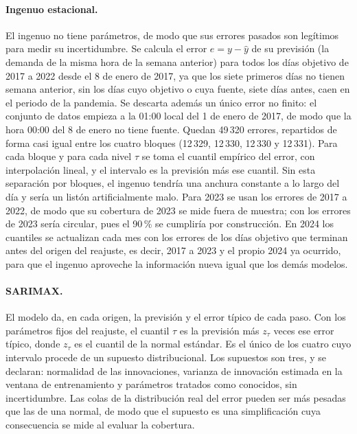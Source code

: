 \paragraph{Ingenuo estacional.} El ingenuo no tiene parámetros, de modo que sus
errores pasados son legítimos para medir su incertidumbre. Se calcula el error
$e = y - \hat{y}$ de su previsión (la demanda de la misma hora de la semana
anterior) para todos los días objetivo de 2017 a 2022 desde el 8 de enero de
2017, ya que los siete primeros días no tienen semana anterior, sin los días
cuyo objetivo o cuya fuente, siete días antes, caen en el periodo de la
pandemia. Se descarta además un único error no finito: el conjunto de datos
empieza a la 01:00 local del 1 de enero de 2017, de modo que la hora
00:00 del 8 de enero no tiene fuente. Quedan 49\,320 errores, repartidos de forma
casi igual entre los cuatro bloques (12\,329, 12\,330, 12\,330 y 12\,331). Para
cada bloque y para cada nivel $\tau$ se toma el cuantil empírico del error,
con interpolación lineal, y el intervalo es la previsión más ese cuantil.
Sin esta separación por bloques, el ingenuo tendría una anchura constante a
lo largo del día y sería un listón artificialmente malo. Para 2023 se usan los
errores de 2017 a 2022, de modo que su cobertura de 2023 se mide fuera de
muestra; con los errores de 2023 sería circular, pues el 90\,\% se cumpliría
por construcción. En 2024 los cuantiles se actualizan cada mes con los errores
de los días objetivo que terminan antes del origen del reajuste, es decir,
2017 a 2023 y el propio 2024 ya ocurrido, para que el ingenuo aproveche la
información nueva igual que los demás modelos.

\paragraph{SARIMAX.} El modelo da, en cada origen, la previsión y el error
típico de cada paso. Con los parámetros fijos del reajuste, el cuantil $\tau$
es la previsión más $z_\tau$ veces ese error típico, donde $z_\tau$ es el
cuantil de la normal estándar. Es el único de los cuatro cuyo intervalo
procede de un supuesto distribucional. Los supuestos son tres, y se declaran:
normalidad de las innovaciones, varianza de innovación estimada en la ventana
de entrenamiento y parámetros tratados como conocidos, sin incertidumbre. Las
colas de la distribución real del error pueden ser más pesadas que las de una
normal, de modo que el supuesto es una simplificación cuya consecuencia
se mide al evaluar la cobertura.

